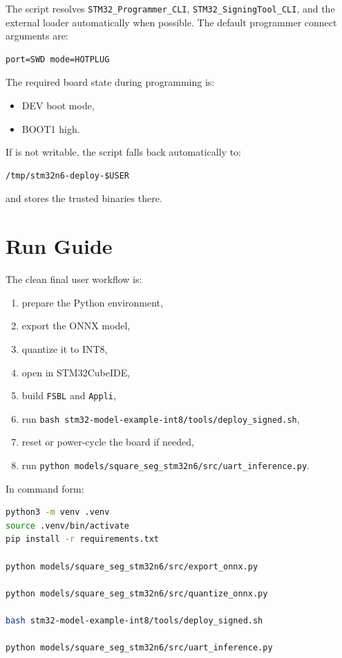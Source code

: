 \documentclass[11pt,a4paper]{article}
\begin{document}
The script resolves \texttt{STM32\_Programmer\_CLI}, \texttt{STM32\_SigningTool\_CLI},
and the external loader automatically when possible. The default programmer connect
arguments are:

\begin{lstlisting}
port=SWD mode=HOTPLUG
\end{lstlisting}

The required board state during programming is:

\begin{itemize}
\item DEV boot mode,
\item BOOT1 high.
\end{itemize}

If  is not writable, the script falls back
automatically to:

\begin{lstlisting}
/tmp/stm32n6-deploy-$USER
\end{lstlisting}

and stores the trusted binaries there.

\section{Run Guide}

The clean final user workflow is:

\begin{enumerate}
\item prepare the Python environment,
\item export the ONNX model,
\item quantize it to INT8,
\item open  in STM32CubeIDE,
\item build \texttt{FSBL} and \texttt{Appli},
\item run \texttt{bash stm32-model-example-int8/tools/deploy\_signed.sh},
\item reset or power-cycle the board if needed,
\item run \texttt{python models/square\_seg\_stm32n6/src/uart\_inference.py}.
\end{enumerate}

In command form:

\begin{lstlisting}[language=bash]
python3 -m venv .venv
source .venv/bin/activate
pip install -r requirements.txt

python models/square_seg_stm32n6/src/export_onnx.py

python models/square_seg_stm32n6/src/quantize_onnx.py

bash stm32-model-example-int8/tools/deploy_signed.sh

python models/square_seg_stm32n6/src/uart_inference.py
\end{lstlisting}
\end{document}
